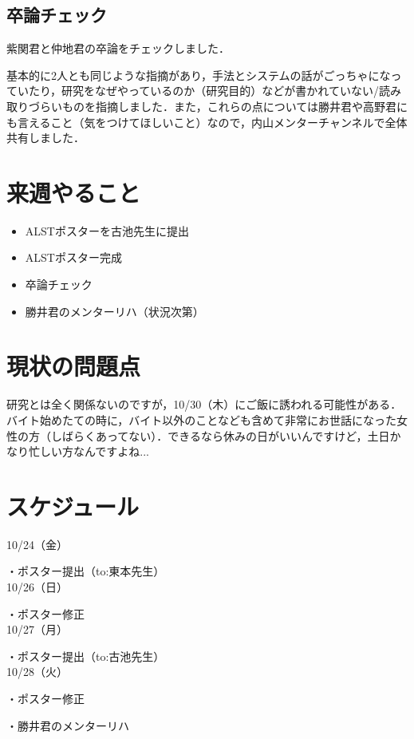 \documentclass[a4paper,12pt]{ltjsarticle}
\begin{document}
\subsection{卒論チェック}
紫関君と仲地君の卒論をチェックしました．

基本的に2人とも同じような指摘があり，手法とシステムの話がごっちゃになっていたり，研究をなぜやっているのか（研究目的）などが書かれていない/読み取りづらいものを指摘しました．また，これらの点については勝井君や高野君にも言えること（気をつけてほしいこと）なので，内山メンターチャンネルで全体共有しました．
\clearpage

\section{来週やること}
\begin{itemize}[label={--}]
  \item ALSTポスターを古池先生に提出
  \item ALSTポスター完成
  \item 卒論チェック
  \item 勝井君のメンターリハ（状況次第）
\end{itemize}

\clearpage

\section{現状の問題点}
研究とは全く関係ないのですが，10/30（木）にご飯に誘われる可能性がある．バイト始めたての時に，バイト以外のことなども含めて非常にお世話になった女性の方（しばらくあってない）．できるなら休みの日がいいんですけど，土日かなり忙しい方なんですよね...
\clearpage

\section{スケジュール}
10/24（金）

・ポスター提出（to:東本先生）\\

10/26（日）

・ポスター修正\\

10/27（月）

・ポスター提出（to:古池先生）\\

10/28（火）

・ポスター修正

・勝井君のメンターリハ\\
\end{document}
